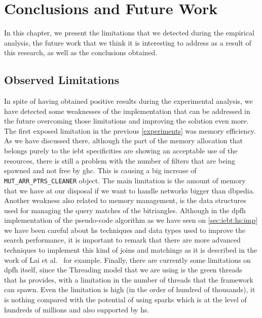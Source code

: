 \chapter{Conclusions and Future Work}\label{conclusions}
In this chapter, we present the limitations that we detected during the empirical analysis, the future work that we think it is interesting to address as a result of this research, 
as well as the conclusions obtained.

\section{Observed Limitations}
In spite of having obtained positive results during the experimental analysis, we have detected some weaknesses of the implementation that can be addressed in the future 
overcoming those limitations and improving the solution even more.
The first exposed limitation in the previous \autoref{experiments} was memory efficiency. As we have discussed there, although the part of the memory allocation that belongs purely to the \acrshort{iebt} specificities are showing an acceptable use of the resources, there is still a problem with the number of filters that are being spawned and not free by \acrshort{ghc}.
This is causing a big increase of \texttt{MUT\_ARR\_PTRS\_CLEANER} object. The main limitation is the amount of memory that we have at our disposal if we want to handle networks bigger than dbpedia.
Another weakness also related to memory management, is the data structures used for managing the query matches of the bitriangles. Although in the \acrshort{dpfh} implementation of the pseudo-code algorithm as we have seen on \autoref{sec:iebt:hs:imp} we have been careful about \acrshort{hs} techniques and data types used to improve the search performance, it is important to remark that 
there are more advanced techniques to implement this kind of joins and matchings as it is described in the work of Lai et al.~\cite{Lai} for example.
Finally, there are currently some limitations on \acrfull{dpfh} itself, since the Threading model that we are using is the green threads~\cite{sparks} that \acrshort{hs} provides, with a limitation in the number of threads that the framework can spawn. Even the limitation is high (in the order of hundred of thousands), it is nothing compared with the potential of using sparks which is at the level of hundreds of millions and also supported by \acrshort{hs}.

